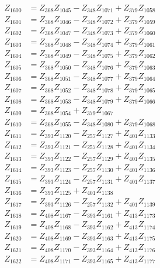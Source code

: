 \begin{multicols}{2}
\begin{align}
Z_{1600} &= Z_{368}Z_{1045} - Z_{348}Z_{1071} + Z_{379}Z_{1058} \nonumber \\
Z_{1601} &= Z_{368}Z_{1046} - Z_{348}Z_{1072} + Z_{379}Z_{1059} \nonumber \\
Z_{1602} &= Z_{368}Z_{1047} - Z_{348}Z_{1073} + Z_{379}Z_{1060} \nonumber \\
Z_{1603} &= Z_{368}Z_{1048} - Z_{348}Z_{1074} + Z_{379}Z_{1061} \nonumber \\
Z_{1604} &= Z_{368}Z_{1049} - Z_{348}Z_{1075} + Z_{379}Z_{1062} \nonumber \\
Z_{1605} &= Z_{368}Z_{1050} - Z_{348}Z_{1076} + Z_{379}Z_{1063} \nonumber \\
Z_{1606} &= Z_{368}Z_{1051} - Z_{348}Z_{1077} + Z_{379}Z_{1064} \nonumber \\
Z_{1607} &= Z_{368}Z_{1052} - Z_{348}Z_{1078} + Z_{379}Z_{1065} \nonumber \\
Z_{1608} &= Z_{368}Z_{1053} - Z_{348}Z_{1079} + Z_{379}Z_{1066} \nonumber \\
Z_{1609} &= Z_{368}Z_{1054} + Z_{379}Z_{1067} \nonumber \\
Z_{1610} &= Z_{368}Z_{1055} - Z_{348}Z_{1080} + Z_{379}Z_{1068} \nonumber \\
Z_{1611} &= Z_{393}Z_{1120} - Z_{257}Z_{1127} + Z_{401}Z_{1133} \nonumber \\
Z_{1612} &= Z_{393}Z_{1121} - Z_{257}Z_{1128} + Z_{401}Z_{1134} \nonumber \\
Z_{1613} &= Z_{393}Z_{1122} - Z_{257}Z_{1129} + Z_{401}Z_{1135} \nonumber \\
Z_{1614} &= Z_{393}Z_{1123} - Z_{257}Z_{1130} + Z_{401}Z_{1136} \nonumber \\
Z_{1615} &= Z_{393}Z_{1124} - Z_{257}Z_{1131} + Z_{401}Z_{1137} \nonumber \\
Z_{1616} &= Z_{393}Z_{1125} + Z_{401}Z_{1138} \nonumber \\
Z_{1617} &= Z_{393}Z_{1126} - Z_{257}Z_{1132} + Z_{401}Z_{1139} \nonumber \\
Z_{1618} &= Z_{408}Z_{1167} - Z_{393}Z_{1161} + Z_{413}Z_{1173} \nonumber \\
Z_{1619} &= Z_{408}Z_{1168} - Z_{393}Z_{1162} + Z_{413}Z_{1174} \nonumber \\
Z_{1620} &= Z_{408}Z_{1169} - Z_{393}Z_{1163} + Z_{413}Z_{1175} \nonumber \\
Z_{1621} &= Z_{408}Z_{1170} - Z_{393}Z_{1164} + Z_{413}Z_{1176} \nonumber \\
Z_{1622} &= Z_{408}Z_{1171} - Z_{393}Z_{1165} + Z_{413}Z_{1177} \nonumber \\

\end{align}
\end{multicols}
